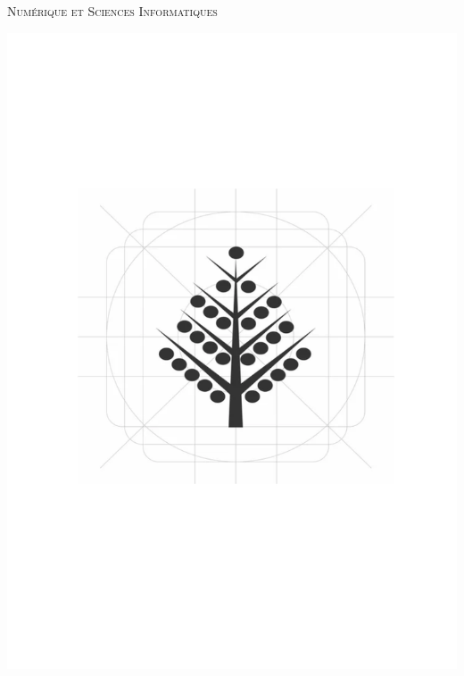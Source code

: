 \begin{titlepage}
\newcommand{\HRule}{\rule{\linewidth}{0.5mm}}
\center
\textsc{\LARGE
Numérique et Sciences Informatiques
} \\[1cm]
\begin{minipage}{0.4\linewidth}
    \centering
    \includegraphics[scale=0.3, trim=20 200 20 200]{Thème 1 – Structures de données/Chapitre 1 - Interface et implémentation/BLOB/arbreb.png}
\end{minipage}\begin{minipage}{0.4\linewidth}
    \centering

\end{minipage}
\end{titlepage}
